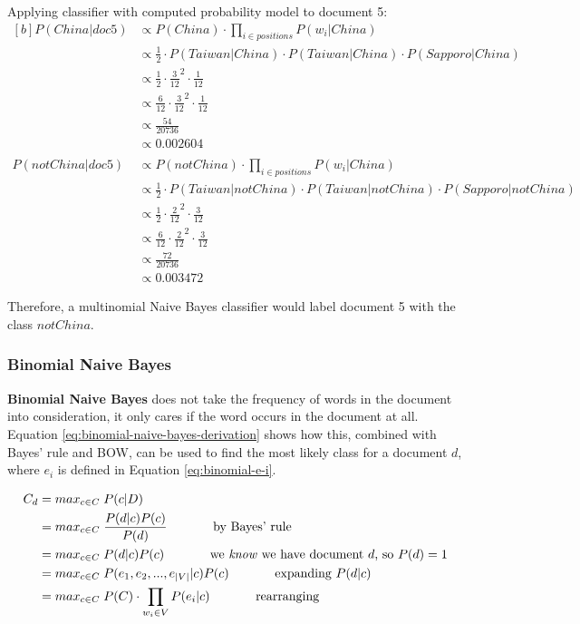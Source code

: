 \documentclass{article}
\begin{document}
Applying classifier with computed probability model to document 5:
\begin{equation}
\begin{aligned}[b]
	P(China|doc5) & \propto P(China) \cdot \prod_{i \in positions} {P(w_i|China)} \\
	& \propto \frac{1}{2} \cdot P(Taiwan|China) \cdot P(Taiwan|China) \cdot P(Sapporo|China) \\
	& \propto \frac{1}{2} \cdot \frac{3}{12}^2 \cdot \frac{1}{12} \\
	& \propto \frac{6}{12} \cdot \frac{3}{12}^2 \cdot \frac{1}{12} \\
	& \propto \frac{54}{20736} \\
	& \propto 0.002604 \\
	& \nonumber \\ 
	P(notChina|doc5) & \propto P(notChina) \cdot \prod_{i \in positions} {P(w_i|China)} \\
	& \propto \frac{1}{2} \cdot P(Taiwan|notChina) \cdot P(Taiwan|notChina) \cdot P(Sapporo|notChina) \\
	& \propto \frac{1}{2} \cdot \frac{2}{12}^2 \cdot \frac{3}{12} \\
	& \propto \frac{6}{12} \cdot \frac{2}{12}^2 \cdot \frac{3}{12} \\	
	& \propto \frac{72}{20736} \\
	& \propto 0.003472
\end{aligned}
\end{equation}

Therefore, a multinomial Naive Bayes classifier would label document 5 with the class $notChina$.

\subsubsection{Binomial Naive Bayes}

\textbf{Binomial Naive Bayes} does not take the frequency of words in the document into consideration, it only cares if the word occurs in the document at all. Equation \ref{eq:binomial-naive-bayes-derivation} shows how this, combined with Bayes' rule and BOW, can be used to find the most likely class for a document $d$, where $e_i$ is defined in Equation \ref{eq:binomial-e-i}.

\begin{equation}
\begin{aligned}[b]
	C_{d} &= max_{c \in C} \; P(c|D) \\
	&= max_{c \in C} \; \frac{P(d|c)P(c)}{P(d)} 
	\;\;\;\;\;\;\;\;\;\;\;\;\; \text{by Bayes' rule} \\
	&= max_{c \in C} \; P(d|c)P(c) 
	\;\;\;\;\;\;\;\;\;\;\;\;\; \text{we \textit{know} we have document }d\text{, so } P(d) = 1 \\
	&= max_{c \in C} \; P(e_1,e_2,...,e_{|V|}| c)P(c)
	\;\;\;\;\;\;\;\;\;\;\;\;\; \text{expanding }P(d|c) \\	
	&= max_{c \in C} \; P(C) \cdot \prod_{w_i \in V} {P(e_i|c)}
	\;\;\;\;\;\;\;\;\;\;\;\;\; \text{rearranging} \\
\end{aligned}
\label{eq:biomial-naive-bayes-derivation}
\end{equation}
\end{document}
